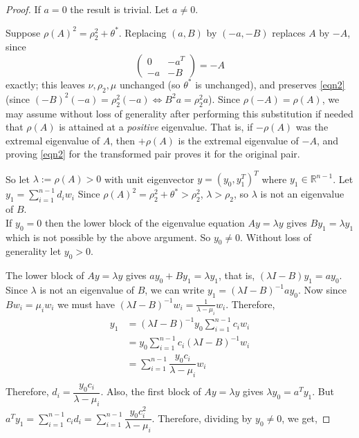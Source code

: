 \documentclass[12pt]{article}
\theoremstyle{plain}
\numberwithin{equation}{section}
\begin{document}
	\begin{proof}
		If $a=0$ the result is trivial. Let $a \neq 0$.
		
		Suppose $\rho(A)^2=\rho_2^2+\theta^*$. Replacing $(a,B)$ by $(-a,-B)$
		replaces $A$ by $-A$, since
		\[
		\begin{pmatrix}0&-a^T\\-a&-B\end{pmatrix}=-A
		\]
		exactly; this leaves $\nu,\rho_2,\mu$
		unchanged (so $\theta^*$ is unchanged), and preserves \eqref{eqn2}
		(since $(-B)^2(-a)=\rho_2^2(-a) \iff B^2a=\rho_2^2a$). Since $\rho(-A)=\rho(A)$,
		we may assume without loss of generality after performing this
		substitution if needed that $\rho(A)$ is attained at a \emph{positive}
		eigenvalue. That is, if $-\rho(A)$ was the extremal eigenvalue of $A$,
		then $+\rho(A)$ is the extremal eigenvalue of $-A$, and proving
		\eqref{eqn2} for the transformed pair proves it for the original pair. 
		
		So let $\lambda:=\rho(A)>0$ with unit eigenvector $y=(y_0,  y_1^T)^T$ where $y_1 \in \mathbb{R}^{n-1}$. Let $y_1= \sum \limits_{i=1}^{n-1}d_iw_i$ Since $\rho(A)^2=\rho_2^2+\theta^*>\rho_2^2$, $\lambda>\rho_2$, so $\lambda$ is
		not an eigenvalue of $B$.\\
		If $y_0=0$ then the lower block of the eigenvalue equation $Ay=\lambda y$ gives 
		$By_1=\lambda y_1$ which is not possible by the above argument. So $y_0\ne0$. Without loss of generality let $y_0 > 0$.
		
		The lower block of $Ay=\lambda y$ gives $ay_0+By_1=\lambda y_1$, that is, $(\lambda I-B)y_1=ay_0$. Since $\lambda$ is not an eigenvalue of $B$, we can write $y_1=(\lambda I-B)^{-1}ay_0$. Now since $Bw_i = \mu_i w_i$ we must have $(\lambda I-B)^{-1}w_i= \frac{1}{\lambda- \mu_i}w_i$. Therefore,\\
		\begin{align*}
			y_1&=(\lambda I-B)^{-1}y_0 \sum \limits_{i=1}^{n-1} c_i w_i\\
			&=y_0\sum \limits_{i=1}^{n-1}c_i(\lambda I-B)^{-1}w_i \\
			&=\sum \limits_{i=1}^{n-1}\dfrac{y_0 c_i}{\lambda- \mu_i}w_i \\
		\end{align*}
		Therefore, $d_i=\dfrac{y_0 c_i}{\lambda- \mu_i}$. Also, the first block of $A y= \lambda y$ gives $\lambda y_0=a^Ty_1$. But $a^Ty_1=\sum \limits_{i=1}^{n-1}c_id_i=\sum \limits_{i=1}^{n-1}\dfrac{y_0 c_i^2}{\lambda- \mu_i}$. Therefore, dividing by $y_0 \neq 0$, we get, 
		

\end{proof}
\end{document}
